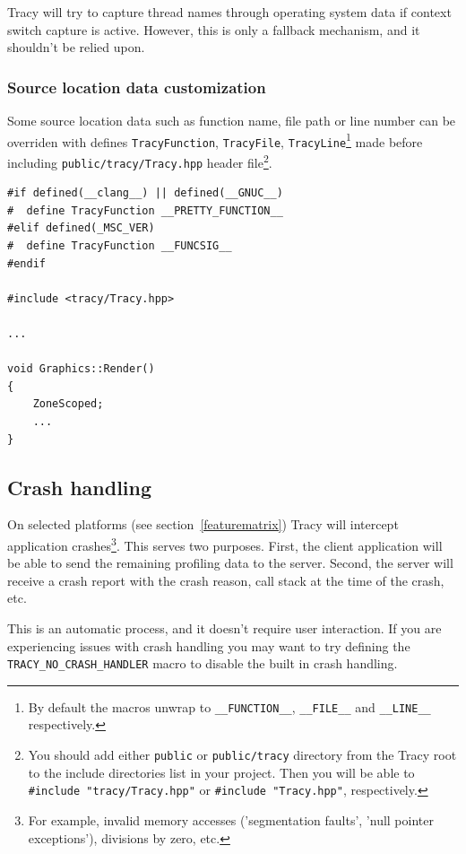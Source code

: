 \documentclass[hidelinks,titlepage,a4paper]{article}
\begin{document}
Tracy will try to capture thread names through operating system data if context switch capture is active. However, this is only a fallback mechanism, and it shouldn't be relied upon.

\subsubsection{Source location data customization}

Some source location data such as function name, file path or line number can be overriden with defines \texttt{TracyFunction}, \texttt{TracyFile}, \texttt{TracyLine}\footnote{By default the macros unwrap to \texttt{\_\_FUNCTION\_\_}, \texttt{\_\_FILE\_\_} and \texttt{\_\_LINE\_\_} respectively.} made before including \texttt{public/tracy/Tracy.hpp} header file\footnote{You should add either \texttt{public} or \texttt{public/tracy} directory from the Tracy root to the include directories list in your project. Then you will be able to \texttt{\#include "tracy/Tracy.hpp"} or \texttt{\#include "Tracy.hpp"}, respectively.}.

\begin{lstlisting}
#if defined(__clang__) || defined(__GNUC__)
#  define TracyFunction __PRETTY_FUNCTION__
#elif defined(_MSC_VER)
#  define TracyFunction __FUNCSIG__
#endif

#include <tracy/Tracy.hpp>

...

void Graphics::Render()
{
    ZoneScoped;
    ...
}
\end{lstlisting}

\subsection{Crash handling}
\label{crashhandling}

On selected platforms (see section~\ref{featurematrix}) Tracy will intercept application crashes\footnote{For example, invalid memory accesses ('segmentation faults', 'null pointer exceptions'), divisions by zero, etc.}. This serves two purposes. First, the client application will be able to send the remaining profiling data to the server. Second, the server will receive a crash report with the crash reason, call stack at the time of the crash, etc.

This is an automatic process, and it doesn't require user interaction. If you are experiencing issues with crash handling you may want to try defining the \texttt{TRACY\_NO\_CRASH\_HANDLER} macro to disable the built in crash handling.
\end{document}

